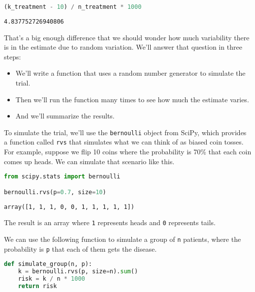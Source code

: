 \begin{lstlisting}[language=Python,style=source]
(k_treatment - 10) / n_treatment * 1000
\end{lstlisting}

\begin{lstlisting}[style=output]
4.837752726940806
\end{lstlisting}

That's a big enough difference that we should wonder how much
variability there is in the estimate due to random variation. We'll
answer that question in three steps:

\begin{itemize}
\item
  We'll write a function that uses a random number generator to simulate
  the trial.
\item
  Then we'll run the function many times to see how much the estimate
  varies.
\item
  And we'll summarize the results.
\end{itemize}

To simulate the trial, we'll use the \passthrough{\lstinline!bernoulli!}
object from SciPy, which provides a function called
\passthrough{\lstinline!rvs!} that simulates what we can think of as
biased coin tosses. For example, suppose we flip 10 coins where the
probability is 70\% that each coin comes up heads. We can simulate that
scenario like this.

\begin{lstlisting}[language=Python,style=source]
from scipy.stats import bernoulli

bernoulli.rvs(p=0.7, size=10)
\end{lstlisting}

\begin{lstlisting}[style=output]
array([1, 1, 1, 0, 0, 1, 1, 1, 1, 1])
\end{lstlisting}

The result is an array where \passthrough{\lstinline!1!} represents
heads and \passthrough{\lstinline!0!} represents tails.

\pagebreak

We can use the following function to simulate a group of
\passthrough{\lstinline!n!} patients, where the probability is
\passthrough{\lstinline!p!} that each of them gets the disease.

\begin{lstlisting}[language=Python,style=source]
def simulate_group(n, p):
    k = bernoulli.rvs(p, size=n).sum()
    risk = k / n * 1000
    return risk
\end{lstlisting}

